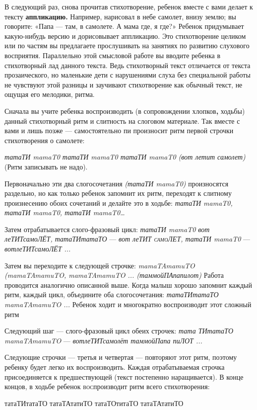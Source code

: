 \documentclass{book}
\renewcommand{\emph}[1]{\textit{#1}}
\begin{document}
В следующий раз, снова прочитав стихотворение, ребенок вместе с вами
делает к тексту \textbf{аппликацию.} Например, нарисовал в небе самолет,
внизу землю; вы говорите: «Папа --- там, в самолете. А мама где, я где?»
Ребенок придумывает какую-нибудь версию и дорисовывает аппликацию. Это
стихотворение целиком или по частям вы предлагаете прослушивать на
занятиях по развитию слухового восприятия. Параллельно этой смысловой
работе вы вводите ребенка в стихотворный лад данного текста. Ведь
стихотворный текст отличается от текста прозаического, но маленькие дети
с нарушениями слуха без специальной работы не чувствуют этой разницы и
заучивают стихотворение как обычный текст, не ощущая его мелодики,
ритма.

Сначала вы учите ребенка воспроизводить (в сопровождении
хлопков\textbf{,} ходьбы) данный стихотворный ритм и слитность на
слоговом материале. Так вместе с вами и лишь позже --- самостоятельно пи
произносит ритм первой строчки стихотворения о самолете:

\emph{татаТИ mamaT0 татаТИ mamaT0 татаТИ mamaT0 (вот летит самолет)}
(Ритм записывать не надо).

Первоначально эти два слогосочетания \emph{(татаТИ mamaT0)} произносятся
раздельно, но как только ребенок запомнит их ритм, переходят к слитному
произнесению обоих сочетаний и делайте это в ходьбе: \emph{татаТИ
mamaT0, татаТИ mamaT0, татаТИ mamaT0\ldots{}}

Затем отрабатывается слого-фразовый цикл: \emph{татаТИ mamaT0 вот
леТИТсамоЛЁТ, татаТИтатаТО} --- \emph{вот леТИТ \textsc{самоЛЕТ,} татаТИ
mamaT0} --- \emph{вотлеТИТсамоЛЁТ ...}

Затем вы переходите к следующей строчке: \emph{mamaTAmamuTO
(mamaTAmamuTO, mamaTAmamuTO ... (таммойПАпапилот)} Работа проводится
аналогично описанной выше. Когда малыш хорошо запомнит каждый ритм,
каждый цикл, объедините оба слогосочетания: \emph{татаТИтатаТО
mamaTAmamuTO ...} Ребенок ходит и многократно воспроизводит этот сложный
ритм

Следующий шаг --- слого-фразовый цикл обеих строчек: \emph{тата ТИтатаТО
mamaTAmamuTO} --- \emph{вотлеТИТсамолёт таммойПапа пиЛОТ ...}

Следующие строчки --- третья и четвертая --- повторяют этот ритм,
поэтому ребенку будет легко их воспроизводить. Каждая отрабатываемая
строчка присоединяется к предшествующей (текст постепенно наращивается).
В конце концов, в ходьбе ребенок \textsc{вос}производит ритм всего
стихотворения:

татаТИтатаТО татаТАтатиТО татаТОтитаТО татаТАтатиТО
\end{document}
